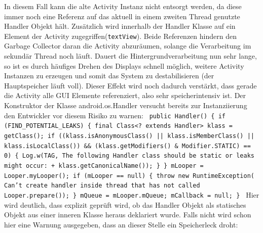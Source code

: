 \documentclass[12pt,oneside,a4paper,bibtotoc,liststotoc]{scrreprt}
\begin{document}
In diesem Fall kann die alte Activity Instanz nicht entsorgt werden, da diese immer noch eine Referenz auf das aktuell in einem zweiten Thread genutzte Handler Objekt hält. Zusätzlich wird innerhalb der Handler Klasse auf ein Element der Activity zugegriffen(\texttt{textView}). Beide Referenzen hindern den Garbage Collector daran die Activity abzuräumen, solange die Verarbeitung im sekundär Thread noch läuft. Dauert die Hintergrundverarbeitung nun sehr lange, so ist es durch häufiges Drehen des Displays schnell möglich, weitere Activity Instanzen zu erzeugen und somit das System zu destabilisieren (der Hauptspeicher läuft voll). Dieser Effekt wird noch dadurch verstärkt, dass gerade die Activity alle GUI Elemente referenziert, also sehr speicherintensiv ist. Der Konstruktor der Klasse android.os.Handler versucht bereits zur Instanziierung den Entwickler vor diesem Risiko zu warnen:\newline
\texttt{ \newline
   public Handler() \{\newline
     if (FIND\_POTENTIAL\_LEAKS) \{ \newline
           final Class<? extends Handler> klass = getClass();\newline
           if ((klass.isAnonymousClass() || klass.isMemberClass() || klass.isLocalClass()) \&\& 
                 (klass.getModifiers() \& Modifier.STATIC) == 0) \{\newline
               Log.w(TAG, \grqq The following Handler class should be static or leaks might occur: \grqq +
                   klass.getCanonicalName());\newline
           \}\newline
       \}\newline
\newline
       mLooper = Looper.myLooper();\newline
       if (mLooper == null) \{\newline
           throw new RuntimeException(
               \grqq Can't create handler inside thread that has not called Looper.prepare()\grqq);\newline
       \}\newline
       mQueue = mLooper.mQueue;\newline
      mCallback = null;\newline
   \}\newline
}\newline
Hier wird deutlich, dass explizit geprüft wird, ob das Handler Objekt als statisches Objekt aus einer inneren Klasse heraus deklariert wurde. Falls nicht wird schon hier eine Warnung ausgegeben, dass an dieser Stelle ein Speicherleck droht:\newline
\end{document}
